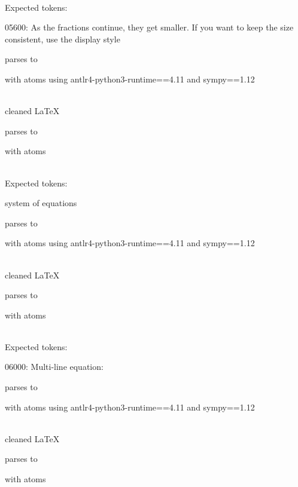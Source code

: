 \documentclass{article}
\begin{document}
\ \\
Expected tokens:



\hrulefill

05600:
As the fractions continue, they get smaller. If you want to keep the size consistent, use the display style

parses to

with atoms
using antlr4-python3-runtime==4.11 and sympy==1.12

\ \\
cleaned \LaTeX

parses to

with atoms


\ \\
Expected tokens:



\hrulefill

system of equations

parses to

with atoms
using antlr4-python3-runtime==4.11 and sympy==1.12

\ \\
cleaned \LaTeX

parses to

with atoms


\ \\
Expected tokens:



\hrulefill

06000:
Multi-line equation:

parses to

with atoms
using antlr4-python3-runtime==4.11 and sympy==1.12

\ \\
cleaned \LaTeX

parses to

with atoms

\end{document}
